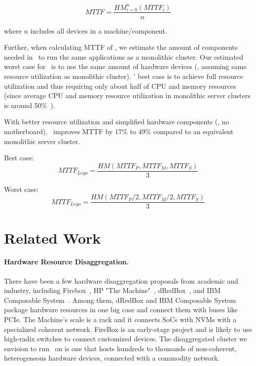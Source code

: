 \documentclass[10pt,times,twocolumn]{z2-article}
\begin{document}
{{{{{{{\vspace{-0.1in}

\begin{small}
\begin{equation}
MTTF = \frac{HM_{i=0}^n(MTTF_i)}{n}
\end{equation}
\end{small}

\vspace{-0.1in}

where $n$ includes all devices in a machine/component. 

Further, when calculating MTTF of \lego, we estimate the amount of components needed in \lego\ 
to run the same applications as a monolithic cluster.
Our estimated worst case for \lego\ is to use the same amount of hardware devices 
(\ie, assuming same resource utilization as monolithic cluster).
\lego' best case is to achieve full resource utilization 
and thus requiring only about half of CPU and memory resources 
(since average CPU and memory resource utilization in monolithic server clusters is around 50\%~\cite{GoogleTrace,AliTrace}).

With better resource utilization and simplified hardware components (\eg, no motherboard),
\lego\ improves MTTF by 17\% to 49\% compared to an equivalent monolithic server cluster.

Best case:
\begin{equation}
MTTF_{Lego} = \frac{HM(MTTF_P, MTTF_M, MTTF_S)}{3}
\end{equation}

Worst case:
\begin{equation}
MTTF_{Lego} = \frac{HM(MTTF_P/2, MTTF_M/2, MTTF_S)}{3}
\end{equation}
\fi

\section{Related Work}
\label{sec:related}

\paragraph{Hardware Resource Disaggregation.}
There have been a few hardware disaggregation proposals from academic and industry,
including Firebox~\cite{FireBox-FASTKeynote}, HP "The Machine"~\cite{HP-TheMachine,HP-MemoryOS}, dRedBox~\cite{dRedBox-DATE},
and IBM Composable System~\cite{IBM-Composable}.
Among them, dRedBox and IBM Composable System package hardware resources in one big case 
and connect them with buses like PCIe.
The Machine's scale is a rack and it connects SoCs with NVMs with a specialized coherent network.
FireBox is an early-stage project and is likely to use high-radix switches to connect  customized devices.
The disaggregated cluster we envision to run \lego\ on is one that hosts hundreds to thousands of
non-coherent, heterogeneous hardware devices, connected with a commodity network.

}}}}}}}
\end{document}
